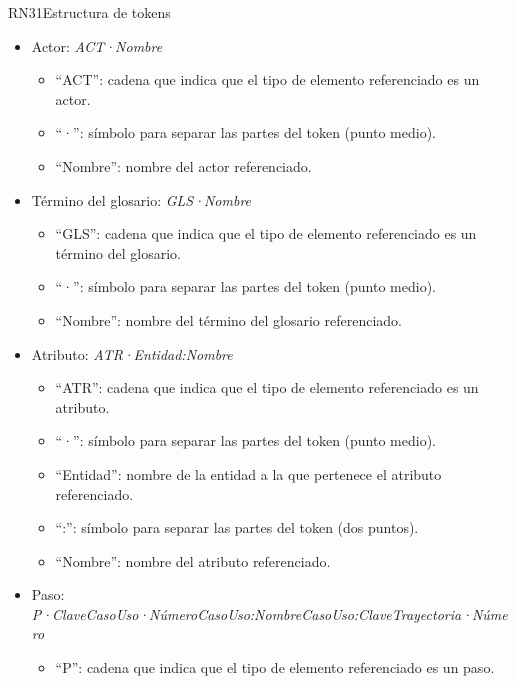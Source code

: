 \begin{BusinessRule}{RN31}{Estructura de tokens}
{\begin{itemize}
\begin{itemize}
					\item ``·'': símbolo para separar las partes del token (punto medio).
					\item ``Número'': número del mensaje referenciado.
					\item ``:'': símbolo para separar las partes del token (dos puntos).
					\item ``Nombre'': nombre del mensaje referenciado.
				\end{itemize}
			\item Actor: {\it ACT·Nombre}
				\begin{itemize}
					\item ``ACT'': cadena que indica que el tipo de elemento referenciado es un actor.
					\item ``·'': símbolo para separar las partes del token (punto medio).
					\item ``Nombre'': nombre del actor referenciado.
				\end{itemize}
			\item Término del glosario: {\it GLS·Nombre}
				\begin{itemize}
					\item ``GLS'': cadena que indica que el tipo de elemento referenciado es un término del glosario.
					\item ``·'': símbolo para separar las partes del token (punto medio).
					\item ``Nombre'': nombre del término del glosario referenciado.
				\end{itemize}
			\item Atributo: {\it ATR·Entidad:Nombre}
				\begin{itemize}
					\item ``ATR'': cadena que indica que el tipo de elemento referenciado es un atributo.
					\item ``·'': símbolo para separar las partes del token (punto medio).
					\item ``Entidad'': nombre de la entidad a la que pertenece el atributo referenciado.
					\item ``:'': símbolo para separar las partes del token (dos puntos).
					\item ``Nombre'': nombre del atributo referenciado.
				\end{itemize}
			\item Paso: {\it P·ClaveCasoUso·NúmeroCasoUso:NombreCasoUso:ClaveTrayectoria·Número}
				\begin{itemize}
					\item ``P'': cadena que indica que el tipo de elemento referenciado es un paso.

\end{itemize}
\end{itemize}}
\end{BusinessRule}
